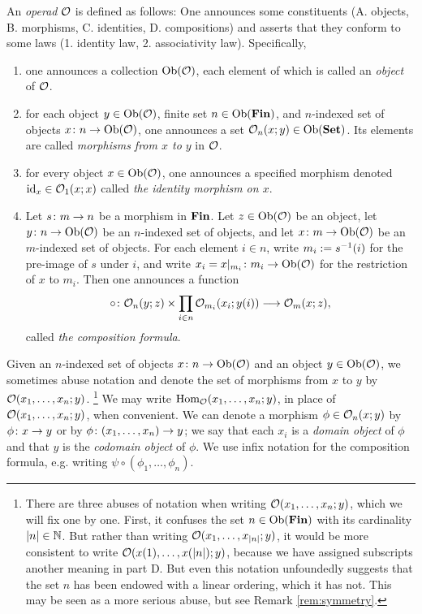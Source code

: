 \documentclass[CT4S-EN-RU]{subfiles}
\begin{document}
\begin{definition}\label{def:operad}

An {\em operad} $\mathcal{O}$ is defined as follows: One announces some constituents (A. objects, B. morphisms, C. identities, D. compositions) and asserts that they conform to some laws (1. identity law, 2. associativity law). Specifically, 
\begin{enumerate}[\hsp A.]
\item one announces a collection $\textnormal{Ob}(\mathcal{O})$, each element of which is called an {\em object} of $\mathcal{O}$.
\item for each object $y\in\textnormal{Ob}(\mathcal{O})$, finite set $n\in\textnormal{Ob}({\bf Fin})$, and $n$-indexed set of objects $x\colon n\rightarrow\textnormal{Ob}(\mathcal{O})$, one announces a set $\mathcal{O}_n(x;y)\in\textnormal{Ob}({\bf Set})$. Its elements are called {\em morphisms from $x$ to $y$} in $\mathcal{O}$. 
\item for every object $x\in\textnormal{Ob}(\mathcal{O})$, one announces a specified morphism denoted $\textnormal{id}_x\in\mathcal{O}_1(x;x)$ called {\em the identity morphism on $x$}.
\item Let $s\colon m\rightarrow n$ be a morphism in ${\bf Fin}$. Let $z\in\textnormal{Ob}(\mathcal{O})$ be an object, let $y\colon n\rightarrow\textnormal{Ob}(\mathcal{O})$ be an $n$-indexed set of objects, and let $x\colon m\rightarrow\textnormal{Ob}(\mathcal{O})$ be an $m$-indexed set of objects. For each element $i\in n$, write $m_i:=s^\m1(i)$ for the pre-image of $s$ under $i$, and write $x_i=x|_{m_i}\colon m_i\rightarrow\textnormal{Ob}(\mathcal{O})$ for the restriction of $x$ to $m_i$. Then one announces a function 
\begin{align}\label{dia:composition formula}
\circ\colon\mathcal{O}_n(y;z)\times\prod_{i\in n}\mathcal{O}_{m_i}(x_i;y(i))\longrightarrow\mathcal{O}_{m}(x;z),
\end{align} 
called {\em the composition formula}.
\end{enumerate}
Given an $n$-indexed set of objects $x\colon n\rightarrow\textnormal{Ob}(\mathcal{O})$ and an object $y\in\textnormal{Ob}(\mathcal{O})$, we sometimes abuse notation and denote the set of morphisms from $x$ to $y$ by $\mathcal{O}(x_1,\ldots,x_n;y)$.
\footnote{There are three abuses of notation when writing $\mathcal{O}(x_1,\ldots,x_n;y)$, which we will fix one by one. First, it confuses the set $n\in\textnormal{Ob}({\bf Fin})$ with its cardinality $|n|\in{\mathbb N}$. But rather than writing $\mathcal{O}(x_1,\ldots,x_{|n|};y)$, it would be more consistent to write $\mathcal{O}(x(1),\ldots,x(|n|);y)$, because we have assigned subscripts another meaning in part D. But even this notation unfoundedly suggests that the set $n$ has been endowed with a linear ordering, which it has not. This may be seen as a more serious abuse, but see Remark \ref{rem:symmetry}.}
We may write $\textnormal{Hom}_\mathcal{O}(x_1,\ldots,x_n;y)$, in place of $\mathcal{O}(x_1,\ldots,x_n;y)$, when convenient. We can denote a morphism $\phi\in\mathcal{O}_n(x;y)$ by $\phi\colon x\rightarrow y$ or by $\phi\colon (x_1,\ldots,x_n)\rightarrow y$; we say that each $x_i$ is a {\em domain object} of $\phi$ and that $y$ is the {\em codomain object} of $\phi$. We use infix notation for the composition formula, e.g. writing $\psi\circ(\phi_1,\ldots,\phi_n)$.


\end{definition}
\end{document}
